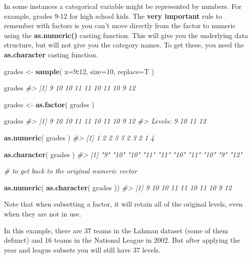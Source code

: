 \documentclass[]{book}
\newenvironment{Shaded}{\begin{snugshade}}{\end{snugshade}}
\newcommand{\CommentTok}[1]{\textcolor[rgb]{0.56,0.35,0.01}{\textit{#1}}}
\newcommand{\DataTypeTok}[1]{\textcolor[rgb]{0.13,0.29,0.53}{#1}}
\newcommand{\DecValTok}[1]{\textcolor[rgb]{0.00,0.00,0.81}{#1}}
\newcommand{\KeywordTok}[1]{\textcolor[rgb]{0.13,0.29,0.53}{\textbf{#1}}}
\newcommand{\NormalTok}[1]{#1}
\newcommand{\OperatorTok}[1]{\textcolor[rgb]{0.81,0.36,0.00}{\textbf{#1}}}
\newcommand{\StringTok}[1]{\textcolor[rgb]{0.31,0.60,0.02}{#1}}
\theoremstyle{definition}
\theoremstyle{definition}
\theoremstyle{definition}
\theoremstyle{remark}
\begin{document}
In some instances a categorical variable might be represented by
numbers. For example, grades 9-12 for high school kids. The \textbf{very
important} rule to remember with factors is you can't move directly from
the factor to numeric using the \textbf{as.numeric()} casting function.
This will give you the underlying data structure, but will not give you
the category names. To get these, you need the \textbf{as.character}
casting function.

\begin{Shaded}
\begin{Highlighting}[]

\NormalTok{grades <-}\StringTok{ }\KeywordTok{sample}\NormalTok{( }\DataTypeTok{x=}\DecValTok{9}\OperatorTok{:}\DecValTok{12}\NormalTok{, }\DataTypeTok{size=}\DecValTok{10}\NormalTok{, }\DataTypeTok{replace=}\NormalTok{T )}

\NormalTok{grades}
\CommentTok{#>  [1]  9 10 10 11 11 10 11 10  9 12}

\NormalTok{grades <-}\StringTok{ }\KeywordTok{as.factor}\NormalTok{( grades )}

\NormalTok{grades}
\CommentTok{#>  [1] 9  10 10 11 11 10 11 10 9  12}
\CommentTok{#> Levels: 9 10 11 12}

\KeywordTok{as.numeric}\NormalTok{( grades )}
\CommentTok{#>  [1] 1 2 2 3 3 2 3 2 1 4}

\KeywordTok{as.character}\NormalTok{( grades )}
\CommentTok{#>  [1] "9"  "10" "10" "11" "11" "10" "11" "10" "9"  "12"}

\CommentTok{# to get back to the original numeric vector}

\KeywordTok{as.numeric}\NormalTok{( }\KeywordTok{as.character}\NormalTok{( grades ))}
\CommentTok{#>  [1]  9 10 10 11 11 10 11 10  9 12}
\end{Highlighting}
\end{Shaded}

Note that when subsetting a factor, it will retain all of the original
levels, even when they are not in use.

In this example, there are 37 teams in the Lahman dataset (some of them
defunct) and 16 teams in the National League in 2002. But after applying
the year and league subsets you will still have 37 levels.
\end{document}
